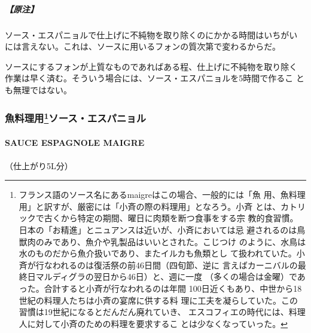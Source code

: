 \documentclass[twoside,12Q,b5j]{escoffierltjsbook}
\begin{document}
\subparagraph{【原注】}\label{ux539fux6ce8}

ソース・エスパニョルで仕上げに不純物を取り除くのにかかる時間はいちがい
には言えない。これは、ソースに用いるフォンの質次第で変わるからだ。

ソースにするフォンが上質なものであればある程、仕上げに不純物を取り除く
作業は早く済む。そういう場合には、ソース・エスパニョルを5時間で作るこ
とも無理ではない。

\vspace*{1.7\zw}

\subsubsection[魚料理用ソース・エスパニョル]{\texorpdfstring{魚料理用\footnote{フランス語のソース名にあるmaigreはこの場合、一般的には「魚
  用、魚料理用」と訳すが、厳密には「小斉の際の料理用」となろう。小斉
  とは、カトリックで古くから特定の期間、曜日に肉類を断つ食事をする宗
  教的食習慣。日本の「お精進」とニュアンスは近いが、小斉においては忌
  避されるのは鳥獣肉のみであり、魚介や乳製品はいいとされた。こじつけ
  のように、水鳥は水のものだから魚介扱いであり、またイルカも魚類とし
  て扱われていた。小斉が行なわれるのは復活祭の前46日間（四旬節、逆に
  言えばカーニバルの最終日マルディグラの翌日から46日）と、週に一度
  （多くの場合は金曜）であった。合計すると小斉が行なわれるのは年間
  100日近くもあり、中世から18世紀の料理人たちは小斉の宴席に供する料
  理に工夫を凝らしていた。この習慣は19世紀になるとだんだん廃れていき、
  エスコフィエの時代には、料理人に対して小斉のための料理を要求するこ
  とは少なくなっていった。}ソース・エスパニョル}{魚料理用ソース・エスパニョル}}\label{ux9b5aux6599ux7406ux75280102006ux30bdux30fcux30b9ux30a8ux30b9ux30d1ux30cbux30e7ux30eb}

\paragraph{SAUCE ESPAGNOLE MAIGRE}\label{sauce-espagnole-maigre}


（仕上がり5L分）
\end{document}
